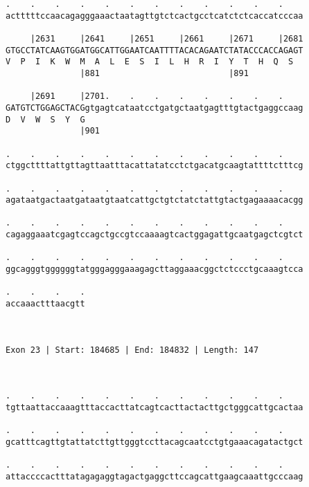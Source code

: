 \documentclass{article}
\begin{document}
\begin{Verbatim}
.    .    .    .    .    .    .    .    .    .    .    .    
actttttccaacagagggaaactaatagttgtctcactgcctcatctctcaccatcccaa
                                                            
     |2631     |2641     |2651     |2661     |2671     |2681
GTGCCTATCAAGTGGATGGCATTGGAATCAATTTTACACAGAATCTATACCCACCAGAGT
V  P  I  K  W  M  A  L  E  S  I  L  H  R  I  Y  T  H  Q  S  
               |881                          |891           
  
     |2691     |2701.    .    .    .    .    .    .    .    
GATGTCTGGAGCTACGgtgagtcataatcctgatgctaatgagtttgtactgaggccaag
D  V  W  S  Y  G                                            
               |901                                         
  
.    .    .    .    .    .    .    .    .    .    .    .    
ctggcttttattgttagttaatttacattatatcctctgacatgcaagtattttctttcg
                                                            
.    .    .    .    .    .    .    .    .    .    .    .    
agataatgactaatgataatgtaatcattgctgtctatctattgtactgagaaaacacgg
                                                            
.    .    .    .    .    .    .    .    .    .    .    .    
cagaggaaatcgagtccagctgccgtccaaaagtcactggagattgcaatgagctcgtct
                                                            
.    .    .    .    .    .    .    .    .    .    .    .    
ggcagggtggggggtatgggagggaaagagcttaggaaacggctctccctgcaaagtcca
                                                            
.    .    .    .
accaaactttaacgtt
                
                
 
Exon 23 | Start: 184685 | End: 184832 | Length: 147



.    .    .    .    .    .    .    .    .    .    .    .    
tgttaattaccaaagtttaccacttatcagtcacttactacttgctgggcattgcactaa
                                                            
.    .    .    .    .    .    .    .    .    .    .    .    
gcatttcagttgtattatcttgttgggtccttacagcaatcctgtgaaacagatactgct
                                                            
.    .    .    .    .    .    .    .    .    .    .    .    
attaccccactttatagagaggtagactgaggcttccagcattgaagcaaattgcccaag
                                                            

\end{Verbatim}
\end{document}
